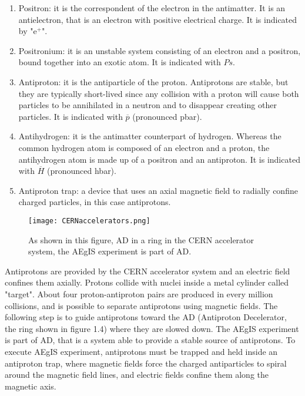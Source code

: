 \begin{enumerate}

\item Positron: it is the correspondent of the electron in the antimatter. It is an antielectron, that is an electron with positive electrical charge. It is indicated by "e$^{+}$".

\item Positronium: it is an unstable system consisting of an electron and a positron, bound together into an exotic atom. It is indicated with $ {Ps} $.

\item Antiproton: it is the antiparticle of the proton. Antiprotons are stable, but they are typically short-lived since any collision with a proton will cause both particles to be annihilated in a neutron and to disappear creating other particles. It is indicated with $ \overline{p} $ (pronounced pbar).

\item Antihydrogen: it is the antimatter counterpart of hydrogen. Whereas the common hydrogen atom is composed of an electron and a proton, the antihydrogen atom is made up of a positron and an antiproton. It is indicated with $ \overline{H} $ (pronounced hbar).


\item Antiproton trap: a device that uses an axial magnetic field to radially confine charged particles, in this case antiprotons.


\end{enumerate}

\begin{figure}[H]
\centering
\texttt{[image: CERNaccelerators.png]} 
\caption{ As shown in this figure, AD in a ring in the CERN accelerator system, the AEgIS experiment is part of AD. }
\end{figure}


Antiprotons are provided by the CERN accelerator system and an electric field confines them axially. 
Protons collide with nuclei inside a metal cylinder called "target". About four proton-antiproton pairs are produced in every million collisions, and is possible to separate antiprotons using magnetic fields. The following step is to guide antiprotons toward the AD (Antiproton Decelerator, the ring shown in figure 1.4) where they are slowed down. 
The AEgIS experiment is part of AD, that is a system able to provide a stable source of antiprotons.
To execute AEgIS experiment, antiprotons must be trapped and held inside an antiproton trap, where magnetic fields force the charged antiparticles to spiral around the magnetic field lines, and electric fields confine them along the magnetic axis.

